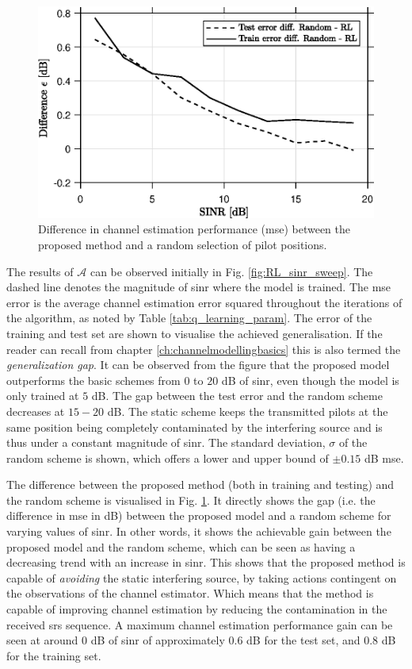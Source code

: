 \begin{figure}
    \centering
    \includegraphics{chapters/part_uplink/figures/results/SINR_sweep_diff.eps}
    \caption{Difference in channel estimation performance (\gls{mse}) between the proposed method and a random selection of pilot positions.}
    \label{fig:RL_SINR_sweep_diff}
\end{figure}
The results of $\mathcal{A}$ can be observed initially in Fig. \ref{fig:RL_sinr_sweep}. The dashed line denotes the magnitude of \gls{sinr} where the model is trained. The \gls{mse} error is the average channel estimation error squared throughout the iterations of the algorithm, as noted by Table \ref{tab:q_learning_param}.  The error of the training and test set are shown to visualise the achieved generalisation. If the reader can recall from chapter \ref{ch:channelmodellingbasics} this is also termed the \emph{generalization gap}. It can be observed from the figure that the proposed model outperforms the basic schemes from $0$ to $20$ dB of \gls{sinr}, even though the model is only trained at $5$ dB. The gap between the test error and the random scheme decreases at $15-20$ dB. The static scheme keeps the transmitted pilots at the same position being completely contaminated by the interfering source and is thus under a constant magnitude of \gls{sinr}. The standard deviation, $\sigma$ of the random scheme is shown, which offers a lower and upper bound of $\pm 0.15$ dB \gls{mse}.


The difference between the proposed method (both in training and testing) and the random scheme is visualised in Fig. \ref{fig:RL_SINR_sweep_diff}. It directly shows the gap (i.e. the difference in \gls{mse} in dB) between the proposed model and a random scheme for varying values of \gls{sinr}. In other words, it shows the achievable gain between the proposed model and the random scheme, which can be seen as having a decreasing trend with an increase in \gls{sinr}. This shows that the proposed method is capable of \emph{avoiding} the static interfering source, by taking actions contingent on the observations of the channel estimator. Which means that the method is capable of improving channel estimation by reducing the contamination in the received \gls{srs} sequence. A maximum channel estimation performance gain can be seen at around $0$ dB of \gls{sinr} of approximately $0.6$ dB for the test set, and $0.8$ dB for the training set. 



